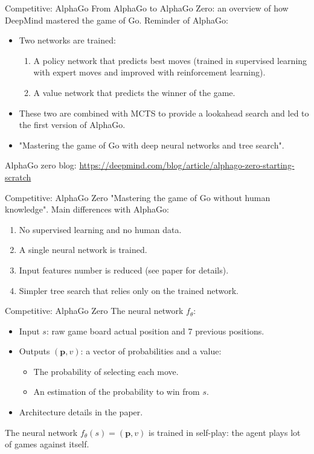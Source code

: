 \documentclass{beamer}
\begin{document}
\begin{frame}{Competitive: AlphaGo}
From AlphaGo to AlphaGo Zero: an overview of how DeepMind mastered the game of Go.
\vfill
Reminder of AlphaGo:
\begin{itemize}
    \item Two networks are trained:
    \begin{enumerate}
        \item A policy network that predicts best moves (trained in supervised learning with expert moves and improved with reinforcement learning).
        \item A value network that predicts the winner of the game.
    \end{enumerate}
    \vfill
    \item These two are combined with MCTS to provide a lookahead search and led to the first version of AlphaGo.
    \vfill
    \item "Mastering the game of Go with deep neural networks and tree search".
\end{itemize}
 \vfill
AlphaGo zero blog: \url{https://deepmind.com/blog/article/alphago-zero-starting-scratch}
\end{frame}

\begin{frame}{Competitive: AlphaGo Zero}
"Mastering the game of Go without human knowledge".
\vfill
Main differences with AlphaGo:
\vfill
\begin{enumerate}
    \item No supervised learning and no human data.
    \vfill
    \item A single neural network is trained.
    \vfill
    \item Input features number is reduced (see paper for details).
    \vfill
    \item Simpler tree search that relies only on the trained network.
    \vfill
\end{enumerate}

\end{frame}

\begin{frame}{Competitive: AlphaGo Zero}
The neural network $f_\theta$:
\vfill
\begin{itemize}
    \item Input $s$: raw game board actual position and 7 previous positions.
    \vfill
    \item Outputs $(\bm{p}, v)$: a vector of probabilities and a value:
    \begin{itemize}
        \item The probability of selecting each move.
        
        \item An estimation of the probability to win from $s$.
    \end{itemize}
    \vfill
    \item Architecture details in the paper.
    \vfill
\end{itemize}
The neural network $f_\theta(s)=(\bm{p}, v)$ is trained in self-play: the agent plays lot of games against itself.
\end{frame}
\end{document}
